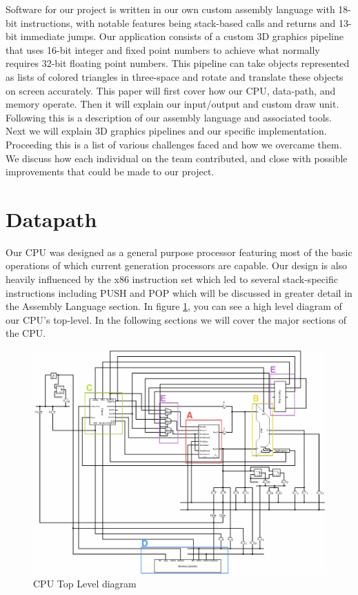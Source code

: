 \documentclass[onecolumn]{IEEEtran}
\begin{document}
Software for our project is written in our own custom assembly language with 18-bit instructions, with notable features being stack-based calls and returns and 13-bit immediate jumps.  Our application consists of a custom 3D graphics pipeline that uses 16-bit integer and fixed point numbers to achieve what normally requires 32-bit floating point numbers.  This pipeline can take objects represented as lists of colored triangles in three-space and rotate and translate these objects on screen accurately.   This paper will first cover how our CPU, data-path, and memory operate.  Then it will explain our input/output and custom draw unit.  Following this is a description of our assembly language and associated tools.  Next we will explain 3D graphics pipelines and our specific implementation.  Proceeding this is a list of various challenges faced and how we overcame them.  We discuss how each individual on the team contributed, and close with possible improvements that could be made to our project.

\section{Datapath}
Our CPU was designed as a general purpose processor featuring most of the basic operations of which current generation processors are capable.  Our design is also heavily influenced by the x86 instruction set which led to several stack-specific instructions including PUSH and POP which will be discussed in greater detail in the Assembly Language section.  In figure \ref{fig:CPU}, you can see a high level diagram of our CPU's top-level.  In the following sections we will cover the major sections of the CPU.

\begin{figure}[H]
	\centering
	\includegraphics[width=1.0\textwidth]{Figure1.png}
	\caption{CPU Top Level diagram}
	\label{fig:CPU}
\end{figure}
\end{document}
